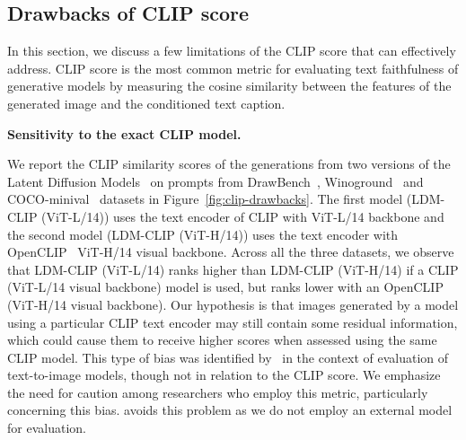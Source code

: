 \begin{table}[!t]
\begin{minipage}[t]{0.45\linewidth}
        \end{minipage}\vspace{-1em}
            
\end{table}

\subsection{Drawbacks of CLIP score}
In this section, we discuss a few limitations of the CLIP score that \OURS can effectively address.
CLIP score is the most common metric for evaluating text faithfulness of generative models by measuring the cosine similarity between the features of the generated image and the conditioned text caption.

\par \noindent \textbf{Sensitivity to the exact CLIP model.}

We report the CLIP similarity scores of the generations from two versions of the Latent Diffusion Models~\cite{rombach2022high} on prompts from DrawBench~\cite{Saharia2022PhotorealisticTD}, Winoground~\cite{Thrush2022WinogroundPV} and COCO-minival~\cite{2014-lin} datasets in Figure~\ref{fig:clip-drawbacks}.
The first model (LDM-CLIP (ViT-L/14)) uses the text encoder of CLIP with ViT-L/14 backbone and the second model (LDM-CLIP (ViT-H/14)) uses the text encoder with OpenCLIP~\cite{ilharco_gabriel_2021_5143773} ViT-H/14 visual backbone.
Across all the three datasets, we observe that LDM-CLIP (ViT-L/14) ranks higher than LDM-CLIP (ViT-H/14) if a CLIP (ViT-L/14 visual backbone) model is used, but ranks lower with an OpenCLIP (ViT-H/14 visual backbone).
Our hypothesis is that images generated by a model using a particular CLIP text encoder may still contain some residual information, which could cause them to receive higher scores when assessed using the same CLIP model.
This type of bias was identified by~\cite{park2021benchmark} in the context of evaluation of text-to-image models, though not in relation to the CLIP score.
We emphasize the need for caution among researchers who employ this metric, particularly concerning this bias.
\OURS avoids this problem as we do not employ an external model for evaluation.




